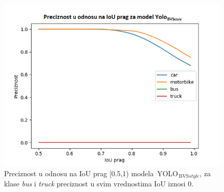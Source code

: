 \documentclass[12pt,oneside]{memoir}
\newcommand{\yolo}{\ensuremath{\,\textrm{YOLO}}}
\newcommand{\bvs}{\ensuremath{\,\textrm{BVS}}}
\begin{document}
\begin{figure}[!ht]
    \centering
    \includegraphics[width=1\textwidth]{matfmaster/glava4/precision_vs_iou_threshold_STYLaugment.png}
    \caption{Preciznost u odnosu na IoU prag [0.5,1) modela $\yolo_{\bvs{style}}$, za klase \textit{bus} i \textit{truck} preciznost u svim vrednostima IoU iznosi 0.}
    \label{fig:section4_yolo4styleaug_prc}
\end{figure}
\end{document}
